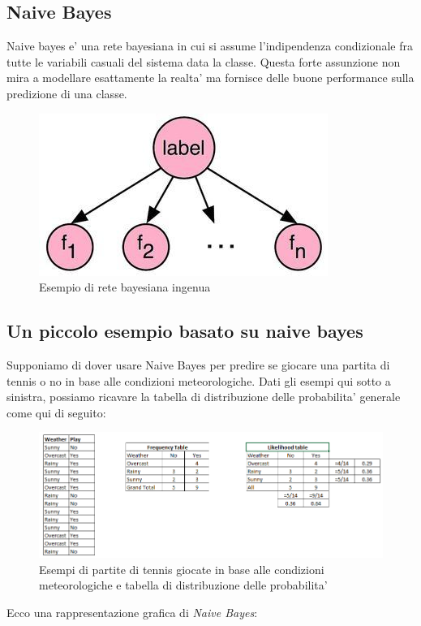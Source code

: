 \subsection*{Naive Bayes}
Naive bayes e' una rete bayesiana in cui si assume l'indipendenza condizionale fra tutte le variabili casuali del sistema data la classe. Questa forte assunzione non mira a modellare esattamente la realta' ma fornisce delle buone performance sulla predizione di una classe.

\begin{figure}[H]
	\centering
	\includegraphics[width=0.4\linewidth]{img/naive_bayes_example}
	\caption{Esempio di rete bayesiana ingenua}
	\label{fig:naivebayesexample}
\end{figure}
\medskip
\subsection*{Un piccolo esempio basato su naive bayes}
Supponiamo di dover usare Naive Bayes per predire se giocare una partita di tennis o no in base alle condizioni meteorologiche. Dati gli esempi qui sotto a sinistra, possiamo ricavare la tabella di distribuzione delle probabilita' generale come qui di seguito:\\
\begin{figure}[H]
	\centering
	\includegraphics[width=0.7\linewidth]{img/Bayes_tennis_sample}
	\caption{Esempi di partite di tennis giocate in base alle condizioni meteorologiche e tabella di distribuzione delle probabilita'}
	\label{}
\end{figure}
\medskip
Ecco una rappresentazione grafica di \textit{Naive Bayes}:\\\\

